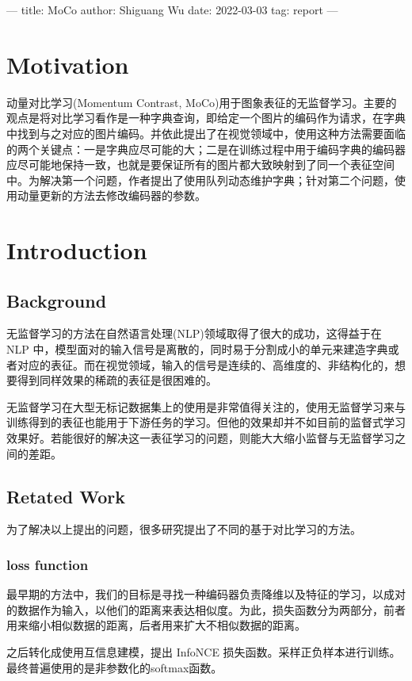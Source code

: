 ---
title: MoCo
author: Shiguang Wu
date: 2022-03-03
tag: report
---



\section{Motivation}

动量对比学习(Momentum Contrast, MoCo)用于图象表征的无监督学习。主要的观点是将对比学习看作是一种字典查询，即给定一个图片的编码作为请求，在字典中找到与之对应的图片编码。并依此提出了在视觉领域中，使用这种方法需要面临的两个关键点：一是字典应尽可能的大；二是在训练过程中用于编码字典的编码器应尽可能地保持一致，也就是要保证所有的图片都大致映射到了同一个表征空间中。为解决第一个问题，作者提出了使用队列动态维护字典；针对第二个问题，使用动量更新的方法去修改编码器的参数。

\section{Introduction}
\subsection{Background}
无监督学习的方法在自然语言处理(NLP)领域取得了很大的成功，这得益于在 NLP 中，模型面对的输入信号是离散的，同时易于分割成小的单元来建造字典或者对应的表征。而在视觉领域，输入的信号是连续的、高维度的、非结构化的，想要得到同样效果的稀疏的表征是很困难的。

无监督学习在大型无标记数据集上的使用是非常值得关注的，使用无监督学习来与训练得到的表征也能用于下游任务的学习。但他的效果却并不如目前的监督式学习效果好。若能很好的解决这一表征学习的问题，则能大大缩小监督与无监督学习之间的差距。

\subsection{Retated Work}

为了解决以上提出的问题，很多研究提出了不同的基于对比学习的方法。
\subsubsection{loss function}
最早期的方法中，我们的目标是寻找一种编码器负责降维以及特征的学习，以成对的数据作为输入，以他们的距离来表达相似度。为此，损失函数分为两部分，前者用来缩小相似数据的距离，后者用来扩大不相似数据的距离。

之后转化成使用互信息建模，提出 InfoNCE 损失函数。采样正负样本进行训练。最终普遍使用的是非参数化的softmax函数。

